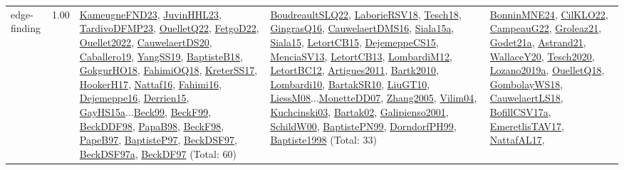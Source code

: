 {\begin{longtable}{p{3cm}r>{\raggedright\arraybackslash}p{6cm}>{\raggedright\arraybackslash}p{6cm}>{\raggedright\arraybackslash}p{8cm}}
\index{edge-finding}\index{Algorithms!edge-finding}edge-finding &  1.00 & \hyperref[detail:KameugneFND23]{KameugneFND23}, \hyperref[detail:JuvinHHL23]{JuvinHHL23}, \hyperref[detail:TardivoDFMP23]{TardivoDFMP23}, \hyperref[detail:OuelletQ22]{OuelletQ22}, \hyperref[detail:FetgoD22]{FetgoD22}, \hyperref[detail:Ouellet2022]{Ouellet2022}, \hyperref[detail:CauwelaertDS20]{CauwelaertDS20}, \hyperref[detail:Caballero19]{Caballero19}, \hyperref[detail:YangSS19]{YangSS19}, \hyperref[detail:BaptisteB18]{BaptisteB18}, \hyperref[detail:GokgurHO18]{GokgurHO18}, \hyperref[detail:FahimiOQ18]{FahimiOQ18}, \hyperref[detail:KreterSS17]{KreterSS17}, \hyperref[detail:HookerH17]{HookerH17}, \hyperref[detail:Nattaf16]{Nattaf16}, \hyperref[detail:Fahimi16]{Fahimi16}, \hyperref[detail:Dejemeppe16]{Dejemeppe16}, \hyperref[detail:Derrien15]{Derrien15}, \hyperref[detail:GayHS15a]{GayHS15a}...\hyperref[detail:Beck99]{Beck99}, \hyperref[detail:BeckF99]{BeckF99}, \hyperref[detail:BeckDDF98]{BeckDDF98}, \hyperref[detail:PapaB98]{PapaB98}, \hyperref[detail:BeckF98]{BeckF98}, \hyperref[detail:PapeB97]{PapeB97}, \hyperref[detail:BaptisteP97]{BaptisteP97}, \hyperref[detail:BeckDSF97]{BeckDSF97}, \hyperref[detail:BeckDSF97a]{BeckDSF97a}, \hyperref[detail:BeckDF97]{BeckDF97} (Total: 60) & \hyperref[detail:BoudreaultSLQ22]{BoudreaultSLQ22}, \hyperref[detail:LaborieRSV18]{LaborieRSV18}, \hyperref[detail:Tesch18]{Tesch18}, \hyperref[detail:GingrasQ16]{GingrasQ16}, \hyperref[detail:CauwelaertDMS16]{CauwelaertDMS16}, \hyperref[detail:Siala15a]{Siala15a}, \hyperref[detail:Siala15]{Siala15}, \hyperref[detail:LetortCB15]{LetortCB15}, \hyperref[detail:DejemeppeCS15]{DejemeppeCS15}, \hyperref[detail:MenciaSV13]{MenciaSV13}, \hyperref[detail:LetortCB13]{LetortCB13}, \hyperref[detail:LombardiM12]{LombardiM12}, \hyperref[detail:LetortBC12]{LetortBC12}, \hyperref[detail:Artigues2011]{Artigues2011}, \hyperref[detail:Bartk2010]{Bartk2010}, \hyperref[detail:Lombardi10]{Lombardi10}, \hyperref[detail:BartakSR10]{BartakSR10}, \hyperref[detail:LiuGT10]{LiuGT10}, \hyperref[detail:LiessM08]{LiessM08}...\hyperref[detail:MonetteDD07]{MonetteDD07}, \hyperref[detail:Zhang2005]{Zhang2005}, \hyperref[detail:Vilim04]{Vilim04}, \hyperref[detail:Kuchcinski03]{Kuchcinski03}, \hyperref[detail:Bartak02]{Bartak02}, \hyperref[detail:Galipienso2001]{Galipienso2001}, \hyperref[detail:SchildW00]{SchildW00}, \hyperref[detail:BaptistePN99]{BaptistePN99}, \hyperref[detail:DorndorfPH99]{DorndorfPH99}, \hyperref[detail:Baptiste1998]{Baptiste1998} (Total: 33) & \hyperref[detail:BonninMNE24]{BonninMNE24}, \hyperref[detail:CilKLO22]{CilKLO22}, \hyperref[detail:CampeauG22]{CampeauG22}, \hyperref[detail:Groleaz21]{Groleaz21}, \hyperref[detail:Godet21a]{Godet21a}, \hyperref[detail:Astrand21]{Astrand21}, \hyperref[detail:WallaceY20]{WallaceY20}, \hyperref[detail:Tesch2020]{Tesch2020}, \hyperref[detail:Lozano2019a]{Lozano2019a}, \hyperref[detail:OuelletQ18]{OuelletQ18}, \hyperref[detail:GombolayWS18]{GombolayWS18}, \hyperref[detail:CauwelaertLS18]{CauwelaertLS18}, \hyperref[detail:BofillCSV17a]{BofillCSV17a}, \hyperref[detail:EmeretlisTAV17]{EmeretlisTAV17}, \hyperref[detail:NattafAL17]{NattafAL17}, 
\end{longtable}}

